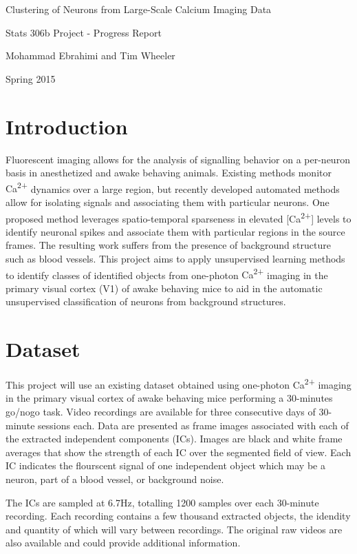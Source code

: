 \documentclass[11pt]{article}
\newcommand{\calcium}[0]{Ca\textsuperscript{2+}}
\begin{document}
\begin{center}
    {\LARGE Clustering of Neurons from Large-Scale Calcium Imaging Data}

    Stats 306b Project - Progress Report

    Mohammad Ebrahimi and Tim Wheeler

    Spring 2015
\end{center}

\section{Introduction}

Fluorescent imaging allows for the analysis of signalling behavior on a per-neuron basis in anesthetized and awake behaving animals. 
Existing methods monitor {\calcium} dynamics over a large region, but recently developed automated methods allow for isolating signals and associating them with particular neurons.
One proposed method leverages spatio-temporal sparseness in elevated [\calcium] levels to identify neuronal spikes and associate them with particular regions in the source frames.
The resulting work suffers from the presence of background structure such as blood vessels.
This project aims to apply unsupervised learning methods to identify classes of identified objects from one-photon {\calcium} imaging in the primary visual cortex (V1) of awake behaving mice to aid in the automatic unsupervised classification of neurons from background structures.

\section{Dataset}

This project will use an existing dataset obtained using one-photon {\calcium} imaging in the primary visual cortex of awake behaving mice performing a \num{30}-minutes go/nogo task.
Video recordings are available for three consecutive days of \num{30}-minute sessions each.
Data are presented as frame images associated with each of the extracted independent components (ICs).
Images are black and white frame averages that show the strength of each IC over the segmented field of view. 
Each IC indicates the flourscent signal of one independent object which may be a neuron, part of a blood vessel, or background noise.

The ICs are sampled at \num{6.7}\si{Hz}, totalling \num{1200} samples over each \num{30}-minute recording. 
Each recording contains a few thousand extracted objects, the idendity and quantity of which will vary between recordings.
The original raw videos are also available and could provide additional information.
\end{document}
